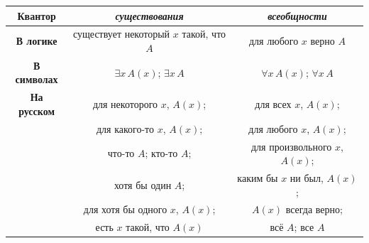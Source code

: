 \documentclass[12pt,notitlepage]{article}
\theoremstyle{plain}
\theoremstyle{definition}
\theoremstyle{plain}
\newcommand{\1}{\mathbf{1}}
\newcommand{\0}{\mathbf{0}}
\newcommand{\mcomm}[1]{}
\begin{document}
\begin{center}
	\begin{tabular}{|c | c | c |}
		\hline
		\bf Квантор & \it существования & \it всеобщности \\
		\hline
		\bf В логике & существует некоторый $x$ такой, что $A$  & для любого $x$ верно $A$ \\
		\hline
		\bf В символах & $\exists x\, A(x)$; $\exists x\, A$   & $\forall x\, A(x)$; $\forall x\, A$ \\
		\hline
		\bf На русском 
		& для некоторого $x$, $A(x)$; & для всех $x$, $A(x)$; \\
		& для какого-то $x$, $A(x)$;  & для любого $x$, $A(x)$; \\
		& что-то $A$; кто-то $A$; &  для произвольного $x$, $A(x)$; \\
		& хотя бы один $A$;  & каким бы $x$ ни был, $A(x)$; \\
		& для хотя бы одного $x$, $A(x)$; & $A(x)$ всегда верно; \\
		& есть $x$ такой, что $A(x)$ & всё $A$; все $A$  \\
		\hline
	\end{tabular}
\end{center}
\mcomm{}
\end{document}
